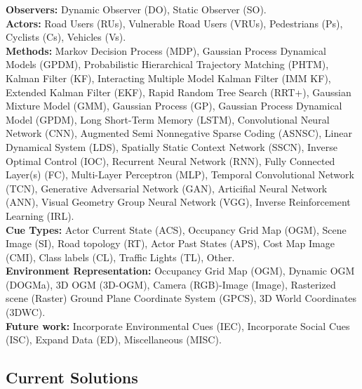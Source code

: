 \begin{table}[h!]
{		\textbf{Observers:}
		Dynamic Observer (DO),
		Static Observer (SO). \\\hspace{\textwidth} 
		\textbf{Actors:}
		Road Users (RUs),
		Vulnerable Road Users (VRUs),
		Pedestrians (Ps),
		Cyclists (Cs),
		Vehicles (Vs). \\\hspace{\textwidth} 
		\textbf{Methods:} 
		Markov Decision Process (MDP),
		Gaussian Process Dynamical Models (GPDM),
		Probabilistic Hierarchical Trajectory Matching  (PHTM),
		Kalman Filter (KF),
		Interacting Multiple Model Kalman Filter (IMM KF),
		Extended Kalman Filter (EKF),
		Rapid Random Tree Search (RRT+),
		Gaussian Mixture Model (GMM),
		Gaussian Process (GP),
		Gaussian Process Dynamical Model (GPDM),
		Long Short-Term Memory (LSTM),
		Convolutional Neural Network (CNN),
		Augmented Semi Nonnegative Sparse Coding (ASNSC),
		Linear Dynamical System (LDS),
		Spatially Static Context Network (SSCN),
		Inverse Optimal Control (IOC),
		Recurrent Neural Network (RNN),
		Fully Connected Layer(s) (FC),
		Multi-Layer Perceptron (MLP),
		Temporal Convolutional Network (TCN),
		Generative Adversarial Network (GAN),
		Articifial Neural Network (ANN),
		Visual Geometry Group Neural Network (VGG),
		Inverse Reinforcement Learning (IRL). \\\hspace{\textwidth} 
		\textbf{Cue Types:}
		Actor Current State (ACS),
		Occupancy Grid Map (OGM),
		Scene Image (SI),
		Road topology (RT),
		Actor Past States (APS),
		Cost Map Image (CMI),
		Class labels (CL),
		Traffic Lights (TL),
		Other. \\\hspace{\textwidth} 
		\textbf{Environment Representation:}
		Occupancy Grid Map (OGM),
		Dynamic OGM (DOGMa),
		3D OGM (3D-OGM),
		Camera (RGB)-Image (Image),
		Rasterized scene (Raster)
		Ground Plane Coordinate System (GPCS),
		3D World Coordinates (3DWC). \\\hspace{\textwidth} 
		\textbf{Future work:}
		Incorporate Environmental Cues (IEC),
		Incorporate Social Cues (ISC),
		Expand Data (ED),
		Miscellaneous (MISC).}
	\label{tab:overview_mot_pred}
\end{table}



\subsection{Current Solutions}

